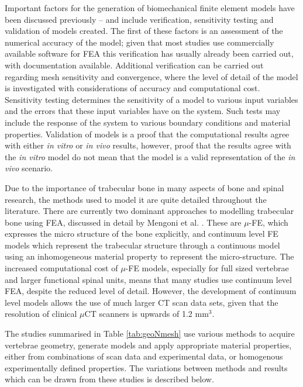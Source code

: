 Important factors for the generation of biomechanical finite element
models have been discussed previously \cite{Jones2008}--\cite{Viceconti2005}
and include
verification, sensitivity testing and validation of models created. The
first of these factors is an assessment of the numerical accuracy of
the model; given that most studies use commercially available software
for FEA this verification has usually already been carried out, with
documentation available. Additional verification can be carried out
regarding mesh sensitivity and convergence, where the level of detail of
the model is investigated with considerations of accuracy and
computational cost. Sensitivity testing determines the sensitivity of a
model to various input variables and the errors that these input
variables have on the system. Such tests may include the response of the
system to various boundary conditions and material properties.
Validation of models is a proof that the computational results agree
with either \emph{in vitro} or \emph{in vivo} results, however, proof
that the results agree with the \emph{in vitro} model do not mean that
the model is a valid representation of the \emph{in vivo} scenario.

Due to the importance of trabecular bone in many aspects of bone and
spinal research, the methods used to model it are quite detailed
throughout the literature. There are currently two dominant approaches
to modelling trabecular bone using FEA, discussed in detail by Mengoni
et al. \cite{Mengoni2014}. These are $\mu$-FE, which expresses the micro
structure
of
the bone explicitly, and continuum level FE models which represent the
trabecular structure through a continuous model using an inhomogeneous
material property to represent the micro-structure. The
increased computational cost of $\mu$-FE models, especially for full sized
vertebrae and larger functional spinal units, means that many studies use
continuum level FEA, despite the reduced level of
detail. However, the development of continuum level models allows the use of much larger CT scan data sets, given that the resolution of clinical $\mu$CT scanners is upwards of 1.2 mm$^3$.

The studies summarised in Table \ref{tab:geoNmesh} use various methods to
acquire
vertebrae geometry, generate models and apply appropriate material
properties, either from combinations of scan data and experimental data,
or homogenous experimentally defined properties. The variations between
methods and results which can be drawn from these studies is described
below.

